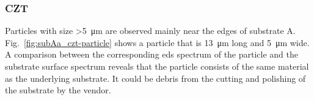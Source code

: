 \begin{comment}
\begin{figure}[htbp]
    \centering
    \subfigure[SEM image at a magnification of 200000$\times$.]{\texttt{[image: substrateA\_a1\_m016.jpg]}\label{fig:substrateA_a1_m016}}
    \quad
    \subfigure[EDS.]{\texttt{[image: eds\_subA\_SiO2.jpg]}\label{fig:subA_200nm_eds}}
    \caption[]{High resolution scanning electron microscopy (SEM) image and the corresponding \acf{eds} spectrum of a particle on substrate A at a magnification of 200000$\times$).}
    \label{fig:subA_partII}
\end{figure}
\end{comment}

\subsubsection{CZT}
Particles with size \SI{>5}{\micro\metre} are observed mainly near the edges of substrate A. Fig.~\ref{fig:subAa_czt-particle} shows a particle that is \SI{13}{\micro\metre} long and \SI{5}{\micro\metre} wide. A comparison between the corresponding \ac{eds} spectrum of the particle and the substrate surface spectrum reveals that the particle consists of the same material as the underlying substrate. It could be debris from the cutting and polishing of the substrate by the vendor.

\begin{comment}
\begin{figure}[htbp]
    \centering
    \subfigure[SEM image at a magnification of 7000$\times$.]{\texttt{[image: substrateA\_a2\_m011.jpg]}\label{fig:substrateA_a2_m011}}
    \quad
    \subfigure[EDS.]{\texttt{[image: eds\_subA\_CZT.jpg]}\label{fig:eds_subA_CZT}}
    \caption[]{Scanning electron microscopy (SEM) image and the corresponding \acf{eds} spectrum of a particle on substrate A at a magnification of 7000$\times$).}
    \label{fig:subA_czt}
\end{figure}
\end{comment}

